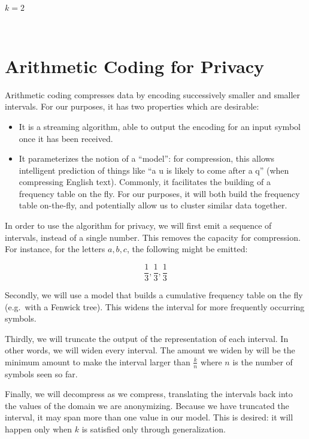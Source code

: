 \documentclass[11pt]{article}
\providecommand{\tightlist}{%
      \setlength{\itemsep}{0pt}\setlength{\parskip}{0pt}}
\begin{document}
    $k = 2$

    
    \begin{center}
    \end{center}
    { \hspace*{\fill} \\}
    
    \hypertarget{arithmetic-coding-for-privacy}{%
\section{Arithmetic Coding for
Privacy}\label{arithmetic-coding-for-privacy}}

Arithmetic coding compresses data by encoding successively smaller and
smaller intervals. For our purposes, it has two properties which are
desirable:

\begin{itemize}
\tightlist
\item
  It is a streaming algorithm, able to output the encoding for an input
  symbol once it has been received.
\item
  It parameterizes the notion of a ``model'': for compression, this
  allows intelligent prediction of things like ``a u is likely to come
  after a q'' (when compressing English text). Commonly, it facilitates
  the building of a frequency table on the fly. For our purposes, it
  will both build the frequency table on-the-fly, and potentially allow
  us to cluster similar data together.
\end{itemize}

In order to use the algorithm for privacy, we will first emit a sequence
of intervals, instead of a single number. This removes the capacity for
compression. For instance, for the letters \(a,b,c\), the following
might be emitted:

\[\frac{1}{3},\frac{1}{3},\frac{1}{3}\]

Secondly, we will use a model that builds a cumulative frequency table
on the fly (e.g.~with a Fenwick tree). This widens the interval for more
frequently occurring symbols.

Thirdly, we will truncate the output of the representation of each
interval. In other words, we will widen every interval. The amount we
widen by will be the minimum amount to make the interval larger than
\(\frac{k}{n}\) where \(n\) is the number of symbols seen so far.

Finally, we will decompress as we compress, translating the intervals
back into the values of the domain we are anonymizing. Because we have
truncated the interval, it may span more than one value in our model.
This is desired: it will happen only when \(k\) is satisfied only
through generalization.
\end{document}
